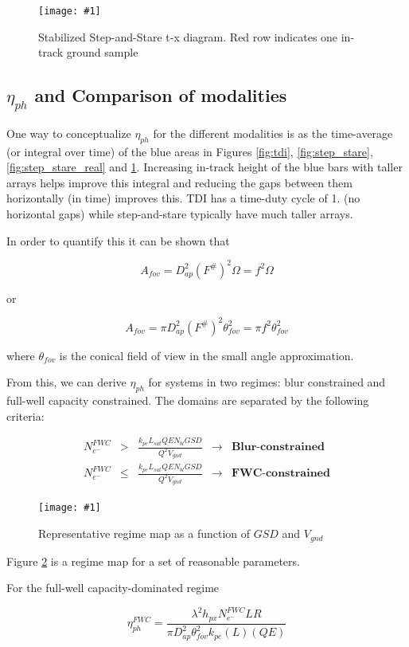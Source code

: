 \documentclass[10pt,journal]{IEEEtran}  %
\newcommand{\includefigure}[3]
{
  \begin{figure}[h!]
  \centering
  \texttt{[image: \#1]}
  \caption[]{#3}
  \label{#2}
  \end{figure}
}
\begin{document}
\includefigure{figures/stab_step_stare.pgf}{fig:stab_step_stare}{Stabilized Step-and-Stare t-x diagram.  Red row indicates one in-track ground sample}

\subsection{$\eta_{ph}$ and Comparison of modalities}
\label{sec:eta_ph}

One way to conceptualize $\eta_{ph}$ for the different modalities is as the time-average (or integral over time) of the blue areas in Figures \ref{fig:tdi}, \ref{fig:step_stare}, \ref{fig:step_stare_real} and \ref{fig:stab_step_stare}.  Increasing in-track height of the blue bars with taller arrays helps improve this integral and reducing the gaps between them horizontally (in time) improves this.  TDI has a time-duty cycle of 1. (no horizontal gaps) while step-and-stare typically have much taller arrays.

In order to quantify this it can be shown that

$$A_{fov} = D_{ap}^2 \left(F^\# \right)^2 \Omega = f^2 \Omega $$

or 

$$A_{fov} = \pi D_{ap}^2 \left(F^\# \right)^2 \theta_{fov}^2 = \pi f^2 \theta_{fov}^2$$

where $\theta_{fov}$ is the conical field of view in the small angle approximation.

From this, we can derive $\eta_{ph}$ for systems in two regimes: blur constrained and full-well capacity constrained.  The domains are separated by the following criteria:

\begin{align*}
    N_{e^-}^{FWC} &>& \frac{k_{pe}L_{sat}QE N_{bl} GSD}{Q^2 V_{gnd}} & \rightarrow &  \textbf{Blur-constrained} \\
    N_{e^-}^{FWC} &\leq& \frac{k_{pe}L_{sat}QE N_{bl} GSD}{Q^2 V_{gnd}} & \rightarrow &  \textbf{FWC-constrained}
\end{align*}

\includefigure{figures/blur_fwc_regime.pgf}{fig:eta_regime}{Representative regime map as a function of $GSD$ and $V_{gnd}$}

Figure \ref{fig:eta_regime} is a regime map for a set of reasonable parameters.

For the full-well capacity-dominated regime

\begin{equation}
    \eta_{ph}^{FWC} = \frac{\lambda^2 h_{px} N_{e^-}^{FWC} LR}{\pi D_{ap}^2 \theta_{fov}^2 k_{pe}(L)(QE)}
\end{equation}
\end{document}
